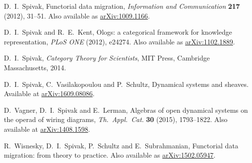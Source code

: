 \documentclass[12pt]{amsart}
\begin{document}
\begin{thebibliography}{10}
 D.\ I.\ Spivak, Functorial data migration, \textsl{Information and Communication} \textbf{217} (2012), 31--51.   Also available as \href{https://arxiv.org/abs/1009.1166}{arXiv:1009.1166}.

  D.\ I.\ Spivak and R.\ E.\ Kent, Ologs: a categorical framework for knowledge representation, \textsl{PLoS ONE} (2012), e24274.    Also available as 
\href{https://arxiv.org/abs/1102.1889}{arXiv:1102.1889}.

  D.\ I.\ Spivak, \textsl{Category Theory for Scientists}, MIT Press, Cambridge Massachusetts, 2014.

 D.\ I.\ Spivak, C.\ Vasilakopoulou and P.\ Schultz, Dynamical systems and sheaves.  Available at \href{https://arxiv.org/abs/1609.08086}{arXiv:1609.08086}.

 D.\ Vagner, D.\ I.\ Spivak and E.\ Lerman, Algebras of open dynamical systems on the operad of wiring diagrams, \textsl{Th.\ Appl.\ Cat.} \textbf{30} (2015), 1793--1822.   Also available at \href{https://arxiv.org/abs/1408.1598}{arXiv:1408.1598}.

  R.\ Wisnesky, D.\ I.\ Spivak, P.\ Schultz and E.\ Subrahmanian, Functorial data migration: from theory to practice.  Also available as \href{https://arxiv.org/abs/1502.05947}{arXiv:1502.05947}.
\end{thebibliography}
\end{document}
